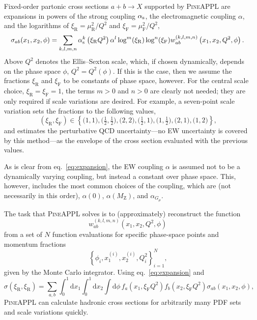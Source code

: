 Fixed-order partonic cross sections $a + b \to X$ supported by \textsc{PineAPPL} are expansions in powers of the strong coupling $\alpha_\mathrm{s}$, the electromagnetic coupling $\alpha$, and the logarithms of $\xi_\mathrm{R} = \mu_\mathrm{R}^2 / Q^2$ and $\xi_\mathrm{F} = \mu_\mathrm{F}^2 / Q^2$,
\begin{equation}
\sigma_{ab} (x_1, x_2, \phi) = \sum_{k,l,m,n} \alpha_\mathrm{s}^k \left( \xi_\mathrm{R} Q^2 \right) \alpha^l \log^m ( \xi_\mathrm{R} ) \log^n ( \xi_\mathrm{F} ) w_{ab}^{(k,l,m,n)} \left( x_1, x_2, Q^2, \phi \right) \text{.}
\label{eq:expansion}
\end{equation}
Above $Q^2$ denotes the Ellis--Sexton scale, which, if chosen dynamically, depends on the phase space $\phi$, $Q^2 = Q^2 (\phi)$.
If this is the case, then we assume the fractions $\xi_\mathrm{R}$ and $\xi_\mathrm{F}$ to be constants of phase space, however.
For the central scale choice, $\xi_\mathrm{R} = \xi_\mathrm{F} = 1$, the terms $m > 0$ and $n > 0$ are clearly not needed; they are only required if scale variations are desired.
For example, a seven-point scale variation sets the fractions to the following values,
\begin{equation}
(\xi_\mathrm{R}, \xi_\mathrm{F}) \in \left\{ \bigl( 1, 1 \bigr), \bigl( \tfrac{1}{2}, \tfrac{1}{2} \bigr), \bigl( 2, 2 \bigr), \bigl( \tfrac{1}{2}, 1 \bigr), \bigl( 1, \tfrac{1}{2} \bigr), \bigl( 2, 1 \bigr), \bigl( 1, 2 \bigr) \right\} \text{,}
\end{equation}
and estimates the perturbative QCD uncertainty---no EW uncertainty is covered by this method---as the envelope of the cross section evaluated with the previous values.

As is clear from eq.~\eqref{eq:expansion}, the EW coupling $\alpha$ is assumed not to be a dynamically varying coupling, but instead a constant over phase space.
This, however, includes the most common choices of the coupling, which are (not necessarily in this order), $\alpha (0)$, $\alpha (M_\mathrm{Z})$, and $\alpha_{G_\mu}$.

The task that \textsc{PineAPPL} solves is to (approximately) reconstruct the function
\begin{equation}
w_{ab}^{(k,l,m,n)} \left( x_1, x_2, Q^2, \phi \right)
\end{equation}
from a set of $N$ function evaluations for specific phase-space points and momentum fractions
\begin{equation}
\left\{ \phi_i, x_1^{(i)}, x_2^{(i)}, Q^2_i \right\}_{i=1}^N \text{,}
\end{equation}
given by the Monte Carlo integrator.
Using eq.~\eqref{eq:expansion} and
\begin{equation}
\sigma (\xi_\mathrm{R}, \xi_\mathrm{R}) = \sum_{a,b} \int_0^1 \mathrm{d} x_1 \int_0^1 \mathrm{d} x_2 \int \mathrm{d} \phi \, f_a (x_1, \xi_\mathrm{F} Q^2) f_b (x_2, \xi_\mathrm{F} Q^2) \sigma_{ab} (x_1, x_2, \phi) \text{,}
\label{eq:pineappl-convolution}
\end{equation}
\textsc{PineAPPL} can calculate hadronic cross sections for arbitrarily many PDF sets and scale variations quickly.

